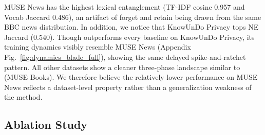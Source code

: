 \begin{table}[!ht]
\centering
\small
\caption{Corpus-level entanglement proxies between the forget and retain splits of each benchmark.}
\label{tab:entanglement}
\end{table}

MUSE News has the highest lexical entanglement (TF-IDF cosine 0.957 and Vocab Jaccard 0.486), an artifact of forget and retain being drawn from the same BBC news distribution. In addition, we notice that KnowUnDo Privacy tops NE Jaccard (0.540). Though \method outperforms every baseline on KnowUnDo Privacy, its training dynamics visibly resemble MUSE News (Appendix Fig.~\ref{fig:dynamics_blade_full}), showing the same delayed spike-and-ratchet pattern. All other datasets show a cleaner three-phase landscape similar to  (MUSE Books). We therefore believe the relatively lower performance on MUSE News reflects a dataset-level property rather than a generalization weakness of the method.


\subsection{Ablation Study}
\label{sec:ablation}

